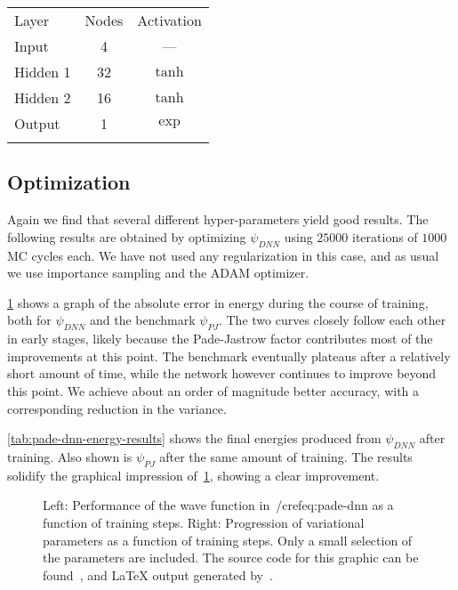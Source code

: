\documentclass[Thesis.tex]{subfiles}
\begin{document}
\begin{center}
  \begin{tabular}{lcc}
    \toprule
    \addlinespace
    Layer & Nodes & Activation\\
    \addlinespace
    \midrule
    \addlinespace
    \addlinespace
    Input & 4 & ---\\
    Hidden 1& 32 & $\tanh$\\
    Hidden 2& 16 & $\tanh$\\
    Output & 1 & $\exp$\\
    \addlinespace
    \addlinespace
    \bottomrule
  \end{tabular}
\end{center}

\subsection{Optimization}

Again we find that several different hyper-parameters yield good results. The
following results are obtained by optimizing $\psi_{DNN}$ using $\num{25000}$
iterations of $1000$ MC cycles each. We have not used any regularization in this
case, and as usual we use importance sampling and the ADAM optimizer.

\cref{fig:QD-pade-dnn-training} shows a graph of the absolute error in energy
during the course of training, both for $\psi_{DNN}$ and the benchmark
$\psi_{PJ}$. The two curves closely follow each other in early stages, likely
because the Pade-Jastrow factor contributes most of the improvements at this point. The
benchmark eventually plateaus after a relatively short amount of time, while the
network however continues to improve beyond this point. We achieve about an
order of magnitude better accuracy, with a corresponding reduction in the
variance.

\cref{tab:pade-dnn-energy-results} shows the final energies produced from
$\psi_{DNN}$ after training. Also shown is $\psi_{PJ}$ after the same amount of
training. The results solidify the graphical impression
of~\cref{fig:QD-pade-dnn-training}, showing a clear improvement.

\begin{figure}[h]
   \centering
    \resizebox{\linewidth}{!}{%
        
    }
    \caption{\label{fig:QD-pade-dnn-training}Left: Performance of the wave
function in~/cref{eq:pade-dnn} as a function of training steps. Right:
Progression of variational parameters as a function of training steps. Only a
small selection of the parameters are included. The source code for this graphic
can be found~\cite[TODO: Add path]{MS-thesis-repository}, and \LaTeX{} output
generated by~\cite{nico_schlomer_2018_1173090}.}
\end{figure}
\end{document}
